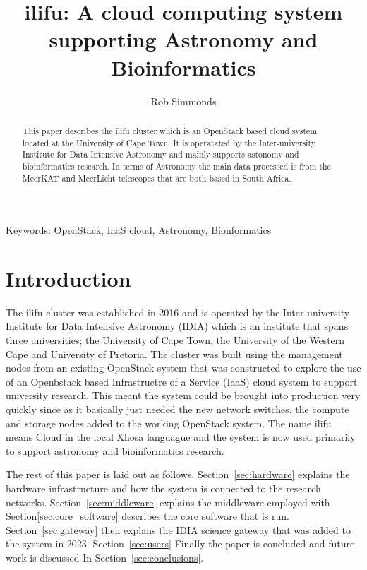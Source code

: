 \documentclass[12pt,twocolumn,a4paper]{article}
\title{ilifu: A cloud computing system supporting Astronomy and Bioinformatics}
\author{Rob Simmonds}
\date{}
\begin{document}
\maketitle

\begin{abstract}
   
This paper describes the ilifu cluster which is an OpenStack based cloud system located at the University of Cape Town. 
It is operatated by the Inter-university Institute for Data Intensive Astronomy and mainly supports 
astonomy and bioinformatics research. In terms of Astronomy the main data processed is from the MeerKAT and MeerLicht 
telescopes that are both based in South Africa.

 \end{abstract}

 Keywords: OpenStack, IaaS cloud, Astronomy, Bionformatics

\section{Introduction}
 
The ilifu cluster was established in 2016 and 
is operated by the Inter-university Institute for Data Intensive Astronomy (IDIA) which is an
institute that spans three universities; the University of Cape Town, the University of the 
Western Cape and University of Pretoria.
The cluster was built using the management nodes from an 
existing OpenStack system that was constructed to explore the 
use of an Openbstack based Infrastructre of a Service (IaaS) cloud system to support university research. 
This meant the
system could be brought into production very quickly since as it basically just needed the new
network switches, the compute and storage nodes added to the working OpenStack system.
The name ilifu means
Cloud in the local Xhosa languague and the system is now used primarily to support
astronomy and bioinformatics research.

The rest of this paper is laid out as follows. Section~\ref{sec:hardware} explains the hardware infrastructure and how
the system is connected to the research networks. Section~\ref{sec:middleware} explains the middleware employed with 
Section\ref{sec:core_software} describes the core software that is run. Section~\ref{sec:gateway} then explans the IDIA
science gateway that was added to the system in 2023. Section~\ref{sec:users} Finally the paper is concluded and future work is discussed In
Section~\ref{sec:conclusions}.
\end{document}
